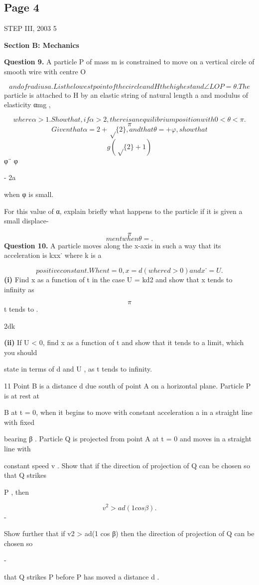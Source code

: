 \documentclass[12pt]{article}
\begin{document}
\subsection*{Page 4}
\begin{flushleft}
STEP III, 2003 5\par
\bigskip\textbf{Section B: Mechanics}\par
\bigskip\textbf{Question 9.} A particle P of mass m is constrained to move on a vertical circle of smooth wire with centre O\par
\[and of radius a. L is the lowest point of the circle and H the highest and ∠LOP = θ . The\]
particle is attached to H by an elastic string of natural length a and modulus of elasticity αmg ,\par
\[where α > 1 . Show that, if α > 2 , there is an equilibrium position with 0 < θ < \pi .\]
\[\pi\]
\[Given that α = 2 + \sqrt\{2\} , and that θ = + φ , show that\]
\[g(\sqrt\{2\} + 1)\]
φ¨ φ\par
\approx - 2a\par
when φ is small.\par
For this value of α, explain briefly what happens to the particle if it is given a small displace-\par
\[\pi\]
\[ment when θ = .\]
\bigskip\textbf{Question 10.} A particle moves along the x-axis in such a way that its acceleration is kxx˙ where k is a\par
\[positive constant. When t = 0, x = d (where d > 0) and x˙ = U .\]
\textbf{(i)} Find x as a function of t in the case U = kd2 and show that x tends to infinity as\par
\[\pi\]
t tends to .\par
2dk\par
\textbf{(ii)} If U < 0, find x as a function of t and show that it tends to a limit, which you should\par
state in terms of d and U , as t tends to infinity.\par
11 Point B is a distance d due south of point A on a horizontal plane. Particle P is at rest at\par
B at t = 0, when it begins to move with constant acceleration a in a straight line with fixed\par
bearing β . Particle Q is projected from point A at t = 0 and moves in a straight line with\par
constant speed v . Show that if the direction of projection of Q can be chosen so that Q strikes\par
P , then\par
\[v^2 > ad (1 cos β) .\]
-\par
Show further that if v2 > ad(1 cos β) then the direction of projection of Q can be chosen so\par
-\par
that Q strikes P before P has moved a distance d .\par
\end{flushleft}
\end{document}
